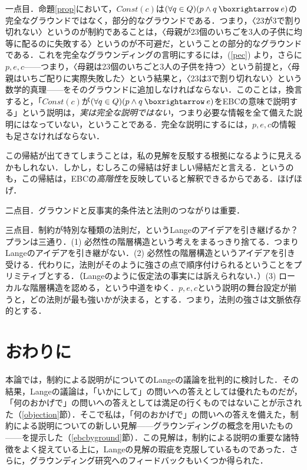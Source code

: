 \documentclass[dvipdfmx,twoside,11pt,uplatex]{jsarticle}
\theoremstyle{definition}
\begin{document}
一点目．命題\ref{prop}において，$Const(c)$は$(\forall q\in Q)(p\land q\necif e)$の完全なグラウンドではなく，部分的なグラウンドである．つまり，〈23が3で割り切れない〉というのが制約であることは，〈母親が23個のいちごを3人の子供に均等に配るのに失敗する〉というのが不可避だ，ということの部分的なグラウンドである．これを完全なグラウンディングの言明にするには，(\ref{pec}) より，さらに$p, e, c$------つまり，〈母親は23個のいちごと3人の子供を持つ〉という前提と，〈母親はいちご配りに実際失敗した〉という結果と，〈23は3で割り切れない〉という数学的真理------をそのグラウンドに追加しなければならない．このことは，換言すると，「$Const(c)$が$(\forall q\in Q)(p\land q\necif e)$をEBCの意味で説明する」という説明は，\emph{実は完全な説明ではない}，つまり必要な情報を全て備えた説明にはなっていない，ということである．完全な説明にするには，$p, e, c$の情報も足さなければならない．

この帰結が出てきてしまうことは，私の見解を反駁する根拠になるように見えるかもしれない．しかし，むしろこの帰結は好ましい帰結だと言える．というのも，この帰結は，EBCの\emph{高階性}を反映していると解釈できるからである．ほげほげ．

二点目．グラウンドと反事実的条件法と法則のつながりは重要．

三点目．制約が特別な種類の法則だ，というLangeのアイデアを引き継げるか？　プランは三通り．(1) 必然性の階層構造という考えをまるっきり捨てる．つまりLangeのアイデアを引き継がない．(2) 必然性の階層構造というアイデアを引き受ける．代わりに，法則がそのように強さの点で順序付けられるということをプリミティブとする．（Langeのように仮定法の事実には訴えられない．）(3) ローカルな階層構造を認める，という中道をゆく．$p, e,c$という説明の舞台設定が揃うと，どの法則が最も強いかが決まる，とする．つまり，法則の強さは文脈依存的とする．

\section{おわりに}
本論では，制約による説明がについてのLangeの議論を批判的に検討した．その結果，Langeの議論は，「いかにして」の問いへの答えとしては優れたものだが，「何のおかげで」の問いへの答えとしては満足の行くものではないことが示された（\ref{objection}節）．そこで私は，「何のおかげで」の問いへの答えを備えた，制約による説明についての新しい見解------グラウンディングの概念を用いたもの------を提示した（\ref{ebcbyground}節）．この見解は，制約による説明の重要な諸特徴をよく捉えている上に，Langeの見解の瑕疵を克服しているものであった．さらに，グラウンディング研究へのフィードバックもいくつか得られた．
\end{document}
